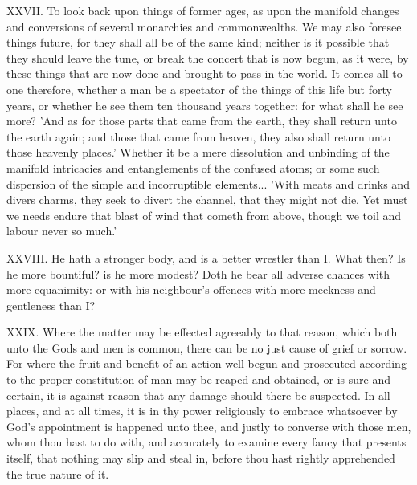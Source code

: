 XXVII. To look back upon things of former ages, as upon the manifold
changes and conversions of several monarchies and commonwealths. We may
also foresee things future, for they shall all be of the same kind;
neither is it possible that they should leave the tune, or break the
concert that is now begun, as it were, by these things that are now done
and brought to pass in the world. It comes all to one therefore, whether a
man be a spectator of the things of this life but forty years, or whether
he see them ten thousand years together: for what shall he see more? 'And
as for those parts that came from the earth, they shall return unto the
earth again; and those that came from heaven, they also shall return unto
those heavenly places.' Whether it be a mere dissolution and unbinding of
the manifold intricacies and entanglements of the confused atoms; or some
such dispersion of the simple and incorruptible elements... 'With meats
and drinks and divers charms, they seek to divert the channel, that they
might not die. Yet must we needs endure that blast of wind that cometh
from above, though we toil and labour never so much.'

XXVIII. He hath a stronger body, and is a better wrestler than I. What
then? Is he more bountiful? is he more modest? Doth he bear all adverse
chances with more equanimity: or with his neighbour's offences with more
meekness and gentleness than I?

XXIX. Where the matter may be effected agreeably to that reason, which
both unto the Gods and men is common, there can be no just cause of grief
or sorrow. For where the fruit and benefit of an action well begun and
prosecuted according to the proper constitution of man may be reaped and
obtained, or is sure and certain, it is against reason that any damage
should there be suspected. In all places, and at all times, it is in thy
power religiously to embrace whatsoever by God's appointment is happened
unto thee, and justly to converse with those men, whom thou hast to do
with, and accurately to examine every fancy that presents itself, that
nothing may slip and steal in, before thou hast rightly apprehended the
true nature of it.

